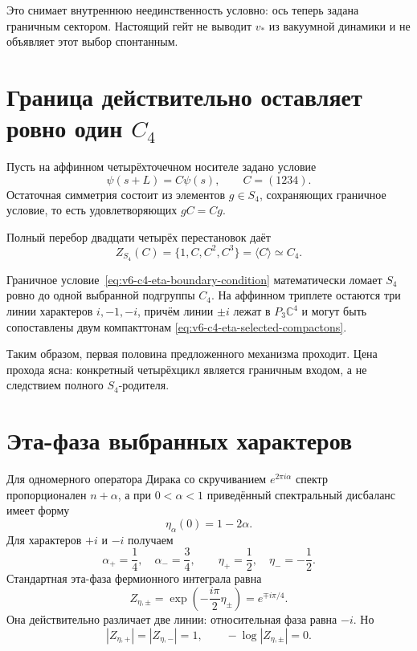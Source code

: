 Это снимает внутреннюю неединственность условно: ось теперь задана
граничным сектором. Настоящий гейт не выводит $v_*$ из вакуумной
динамики и не объявляет этот выбор спонтанным.

\section{Граница действительно оставляет ровно один \texorpdfstring{$C_4$}{C4}}

Пусть на аффинном четырёхточечном носителе задано условие
\begin{equation}
 \psi(s+L)=C\psi(s),
 \qquad
 C=(1234).
 \label{eq:v6-c4-eta-boundary-condition}
\end{equation}
Остаточная симметрия состоит из элементов $g\in S_4$, сохраняющих
граничное условие, то есть удовлетворяющих $gC=Cg$.

Полный перебор двадцати четырёх перестановок даёт
\begin{equation}
 Z_{S_4}(C)=\{1,C,C^2,C^3\}=\langle C\rangle\simeq C_4.
 \label{eq:v6-c4-eta-centralizer}
\end{equation}

\begin{proposition}
Граничное условие~\eqref{eq:v6-c4-eta-boundary-condition} математически
ломает $S_4$ ровно до одной выбранной подгруппы $C_4$. На аффинном
триплете остаются три линии характеров $i,-1,-i$, причём линии $\pm i$
лежат в $P_3\mathbb C^4$ и могут быть сопоставлены двум компакттонам
\eqref{eq:v6-c4-eta-selected-compactons}.
\end{proposition}

Таким образом, первая половина предложенного механизма проходит. Цена
прохода ясна: конкретный четырёхцикл является граничным входом, а не
следствием полного $S_4$-родителя.

\section{Эта-фаза выбранных характеров}

Для одномерного оператора Дирака со скручиванием
$e^{2\pi i\alpha}$ спектр пропорционален $n+\alpha$, а при
$0<\alpha<1$ приведённый спектральный дисбаланс имеет форму
\begin{equation}
 \eta_\alpha(0)=1-2\alpha.
 \label{eq:v6-c4-eta-twisted-circle}
\end{equation}
Для характеров $+i$ и $-i$ получаем
\begin{equation}
 \alpha_+=\frac14,
 \quad
 \alpha_-=\frac34,
 \qquad
 \eta_+=\frac12,
 \quad
 \eta_-=-\frac12.
\end{equation}
Стандартная эта-фаза фермионного интеграла равна
\begin{equation}
 Z_{\eta,\pm}
 =\exp\!\left(-\frac{i\pi}{2}\eta_\pm\right)
 =e^{\mp i\pi/4}.
 \label{eq:v6-c4-eta-unit-phases}
\end{equation}
Она действительно различает две линии: относительная фаза равна $-i$.
Но
\begin{equation}
 |Z_{\eta,+}|=|Z_{\eta,-}|=1,
 \qquad
 -\log|Z_{\eta,\pm}|=0.
 \label{eq:v6-c4-eta-zero-decay}
\end{equation}

